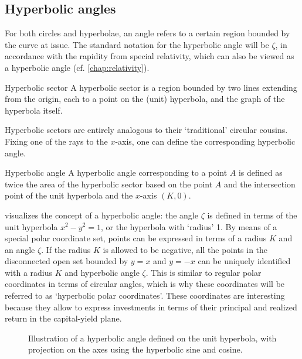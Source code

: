 \subsection{Hyperbolic angles}
For both circles and hyperbolae, an angle refers to a certain region bounded by the curve at issue. The standard notation for the hyperbolic angle will be \(\zeta\), in accordance with the rapidity from special relativity, which can also be viewed as a hyperbolic angle (cf. \cref{chap:relativity}).
\begin{thmblock}{Hyperbolic sector}
A hyperbolic sector is a region bounded by two lines extending from the origin, each to a point on the (unit) hyperbola, and the graph of the hyperbola itself. 
\end{thmblock}
Hyperbolic sectors are entirely analogous to their `traditional' circular cousins. Fixing one of the rays to the \(x\)-axis, one can define the corresponding hyperbolic angle.
\begin{thmblock}{Hyperbolic angle}
A hyperbolic angle corresponding to a point \(A\) is defined as twice the area of the hyperbolic sector based on the point \(A\) and the intersection point of the unit hyperbola and the \(x\)-axis \((K, 0)\).
\end{thmblock}
 visualizes the concept of a hyperbolic angle: the angle $\zeta$ is defined in terms of the unit hyperbola $x^2 - y^2 = 1$, or the hyperbola with `radius' 1. 
By means of a special polar coordinate set, points can be expressed in terms of a radius $K$ and an angle $\zeta$. If the radius \(K\) is allowed to be negative, all the points in the disconnected open set bounded by \(y = x\) and \(y = -x\) can be uniquely identified with a radius \(K\) and hyperbolic angle \(\zeta\). This is similar to regular polar coordinates in terms of circular angles, which is why these coordinates will be referred to as `hyperbolic polar coordinates'. These coordinates are interesting because they allow to express investments in terms of their principal and realized return in the capital-yield plane.

\begin{figure}[ht!]
    \centering
    
    \caption{Illustration of a hyperbolic angle defined on the unit hyperbola, with projection on the axes using the hyperbolic sine and cosine.}
    \label{fig:hyperbolic_angle}
\end{figure}

